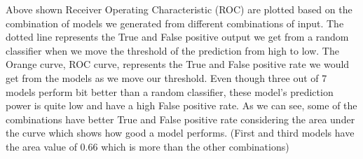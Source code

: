 \documentclass[9pt]{article}
\begin{document}
{\begin{figure}[!htb]
\endminipage
\end{figure}
Above shown Receiver Operating Characteristic (ROC) are plotted based on the combination of models we generated from different combinations of input. The dotted line represents the True and False positive output we get from a random classifier when we move the threshold of the prediction from high to low. The Orange curve, ROC curve, represents the True and False positive rate we would get from the models as we move our threshold. Even though three out of 7 models perform bit better than a random classifier, these model’s prediction power is quite low and have a high False positive rate. As we can see, some of the combinations have better True and False positive rate considering the area under the curve which shows how good a model performs. (First and third models have the area value of 0.66 which is more than the other combinations)

}
\end{document}

